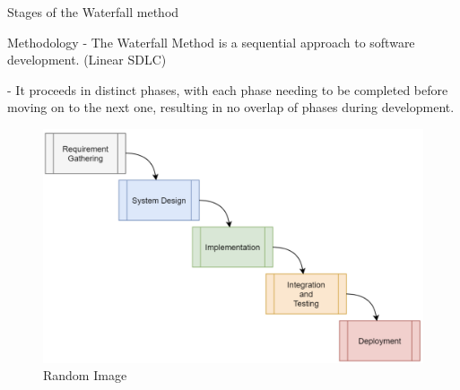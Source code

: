 \begin{frame}{Stages of the Waterfall method}

    \begin{block}{Methodology}
        - The Waterfall Method is a sequential approach to software development. (Linear SDLC) 
        
        - It proceeds in distinct phases, with each phase needing to be completed before moving on to the next one, resulting in no overlap of phases during development. 
    \end{block}   

    \begin{figure}
    \centering
    \includegraphics[scale=0.2]{images/illustrate/model.png}
    \caption{Random Image}
    \end{figure}
    
\end{frame}